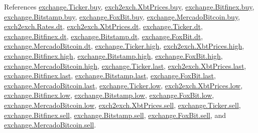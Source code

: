 References \hyperlink{exchange_8py_source_l00058}{exchange.\+Ticker.\+buy}, \hyperlink{exch2exch_8py_source_l00059}{exch2exch.\+Xbt\+Prices.\+buy}, \hyperlink{exchange_8py_source_l00323}{exchange.\+Bitfinex.\+buy}, \hyperlink{exchange_8py_source_l00392}{exchange.\+Bitstamp.\+buy}, \hyperlink{exchange_8py_source_l00464}{exchange.\+Fox\+Bit.\+buy}, \hyperlink{exchange_8py_source_l00526}{exchange.\+Mercado\+Bitcoin.\+buy}, \hyperlink{exch2exch_8py_source_l00028}{exch2exch.\+Rates.\+dt}, \hyperlink{exch2exch_8py_source_l00057}{exch2exch.\+Xbt\+Prices.\+dt}, \hyperlink{exchange_8py_source_l00057}{exchange.\+Ticker.\+dt}, \hyperlink{exchange_8py_source_l00330}{exchange.\+Bitfinex.\+dt}, \hyperlink{exchange_8py_source_l00399}{exchange.\+Bitstamp.\+dt}, \hyperlink{exchange_8py_source_l00463}{exchange.\+Fox\+Bit.\+dt}, \hyperlink{exchange_8py_source_l00533}{exchange.\+Mercado\+Bitcoin.\+dt}, \hyperlink{exchange_8py_source_l00060}{exchange.\+Ticker.\+high}, \hyperlink{exch2exch_8py_source_l00061}{exch2exch.\+Xbt\+Prices.\+high}, \hyperlink{exchange_8py_source_l00325}{exchange.\+Bitfinex.\+high}, \hyperlink{exchange_8py_source_l00394}{exchange.\+Bitstamp.\+high}, \hyperlink{exchange_8py_source_l00466}{exchange.\+Fox\+Bit.\+high}, \hyperlink{exchange_8py_source_l00528}{exchange.\+Mercado\+Bitcoin.\+high}, \hyperlink{exchange_8py_source_l00062}{exchange.\+Ticker.\+last}, \hyperlink{exch2exch_8py_source_l00063}{exch2exch.\+Xbt\+Prices.\+last}, \hyperlink{exchange_8py_source_l00327}{exchange.\+Bitfinex.\+last}, \hyperlink{exchange_8py_source_l00396}{exchange.\+Bitstamp.\+last}, \hyperlink{exchange_8py_source_l00468}{exchange.\+Fox\+Bit.\+last}, \hyperlink{exchange_8py_source_l00530}{exchange.\+Mercado\+Bitcoin.\+last}, \hyperlink{exchange_8py_source_l00061}{exchange.\+Ticker.\+low}, \hyperlink{exch2exch_8py_source_l00062}{exch2exch.\+Xbt\+Prices.\+low}, \hyperlink{exchange_8py_source_l00326}{exchange.\+Bitfinex.\+low}, \hyperlink{exchange_8py_source_l00395}{exchange.\+Bitstamp.\+low}, \hyperlink{exchange_8py_source_l00467}{exchange.\+Fox\+Bit.\+low}, \hyperlink{exchange_8py_source_l00529}{exchange.\+Mercado\+Bitcoin.\+low}, \hyperlink{exch2exch_8py_source_l00058}{exch2exch.\+Xbt\+Prices.\+sell}, \hyperlink{exchange_8py_source_l00059}{exchange.\+Ticker.\+sell}, \hyperlink{exchange_8py_source_l00324}{exchange.\+Bitfinex.\+sell}, \hyperlink{exchange_8py_source_l00393}{exchange.\+Bitstamp.\+sell}, \hyperlink{exchange_8py_source_l00465}{exchange.\+Fox\+Bit.\+sell}, and \hyperlink{exchange_8py_source_l00527}{exchange.\+Mercado\+Bitcoin.\+sell}.


